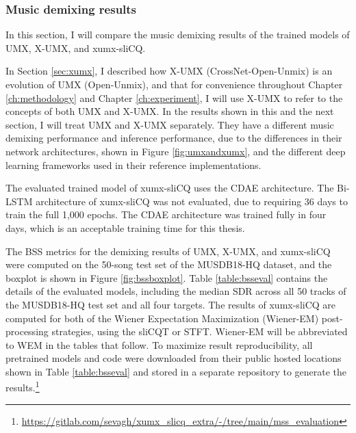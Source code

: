 \documentclass[report.tex]{subfiles}
\begin{document}
\subsubsection{Music demixing results}
\label{sec:demixresults}

In this section, I will compare the music demixing results of the trained models of UMX, X-UMX, and xumx-sliCQ.

In Section \ref{sec:xumx}, I described how X-UMX (CrossNet-Open-Unmix) is an evolution of UMX (Open-Unmix), and that for convenience throughout Chapter \ref{ch:methodology} and Chapter \ref{ch:experiment}, I will use X-UMX to refer to the concepts of both UMX and X-UMX. In the results shown in this and the next section, I will treat UMX and X-UMX separately. They have a different music demixing performance and inference performance, due to the differences in their network architectures, shown in Figure \ref{fig:umxandxumx}, and the different deep learning frameworks used in their reference implementations.

The evaluated trained model of xumx-sliCQ uses the CDAE architecture. The Bi-LSTM architecture of xumx-sliCQ was not evaluated, due to requiring 36 days to train the full 1,000 epochs. The CDAE architecture was trained fully in four days, which is an acceptable training time for this thesis.

The BSS metrics for the demixing results of UMX, X-UMX, and xumx-sliCQ were computed on the 50-song test set of the MUSDB18-HQ dataset, and the boxplot is shown in Figure \ref{fig:bssboxplot}. Table \ref{table:bsseval} contains the details of the evaluated models, including the median SDR across all 50 tracks of the MUSDB18-HQ test set and all four targets. The results of xumx-sliCQ are computed for both of the Wiener Expectation Maximization (Wiener-EM) post-processing strategies, using the sliCQT or STFT. Wiener-EM will be abbreviated to WEM in the tables that follow. To maximize result reproducibility, all pretrained models and code were downloaded from their public hosted locations shown in Table \ref{table:bsseval} and stored in a separate repository to generate the results.\footnote{\url{https://gitlab.com/sevagh/xumx_slicq_extra/-/tree/main/mss_evaluation}}
\end{document}
